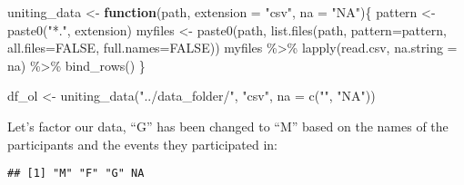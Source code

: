 \documentclass[
]{article}
\newenvironment{Shaded}{\begin{snugshade}}{\end{snugshade}}
\newcommand{\AttributeTok}[1]{\textcolor[rgb]{0.77,0.63,0.00}{#1}}
\newcommand{\CommentTok}[1]{\textcolor[rgb]{0.56,0.35,0.01}{\textit{#1}}}
\newcommand{\ConstantTok}[1]{\textcolor[rgb]{0.00,0.00,0.00}{#1}}
\newcommand{\ControlFlowTok}[1]{\textcolor[rgb]{0.13,0.29,0.53}{\textbf{#1}}}
\newcommand{\FunctionTok}[1]{\textcolor[rgb]{0.00,0.00,0.00}{#1}}
\newcommand{\NormalTok}[1]{#1}
\newcommand{\OtherTok}[1]{\textcolor[rgb]{0.56,0.35,0.01}{#1}}
\newcommand{\SpecialCharTok}[1]{\textcolor[rgb]{0.00,0.00,0.00}{#1}}
\newcommand{\StringTok}[1]{\textcolor[rgb]{0.31,0.60,0.02}{#1}}
\begin{document}
\begin{Shaded}
\begin{Highlighting}[]
\NormalTok{uniting\_data }\OtherTok{\textless{}{-}} \ControlFlowTok{function}\NormalTok{(path, }\AttributeTok{extension =} \StringTok{"csv"}\NormalTok{, }\AttributeTok{na =} \StringTok{"NA"}\NormalTok{)\{}
\NormalTok{  pattern }\OtherTok{\textless{}{-}} \FunctionTok{paste0}\NormalTok{(}\StringTok{"*."}\NormalTok{, extension)}
\NormalTok{  myfiles }\OtherTok{\textless{}{-}}  \FunctionTok{paste0}\NormalTok{(path, }\FunctionTok{list.files}\NormalTok{(path, }\AttributeTok{pattern=}\NormalTok{pattern, }\AttributeTok{all.files=}\ConstantTok{FALSE}\NormalTok{,}
           \AttributeTok{full.names=}\ConstantTok{FALSE}\NormalTok{))}
\NormalTok{  myfiles }\SpecialCharTok{\%\textgreater{}\%} \FunctionTok{lapply}\NormalTok{(read.csv, }\AttributeTok{na.string =}\NormalTok{ na) }\SpecialCharTok{\%\textgreater{}\%} \FunctionTok{bind\_rows}\NormalTok{()}
\NormalTok{\}}

\NormalTok{df\_ol }\OtherTok{\textless{}{-}} \FunctionTok{uniting\_data}\NormalTok{(}\StringTok{"../data\_folder/"}\NormalTok{, }\StringTok{"csv"}\NormalTok{, }\AttributeTok{na =} \FunctionTok{c}\NormalTok{(}\StringTok{""}\NormalTok{, }\StringTok{"NA"}\NormalTok{))}
\end{Highlighting}
\end{Shaded}

Let's factor our data, ``G'' has been changed to ``M'' based on the
names of the participants and the events they participated in:

\begin{Shaded}
\end{Shaded}

\begin{verbatim}
## [1] "M" "F" "G" NA
\end{verbatim}

\begin{Shaded}
\end{Shaded}
\end{document}
